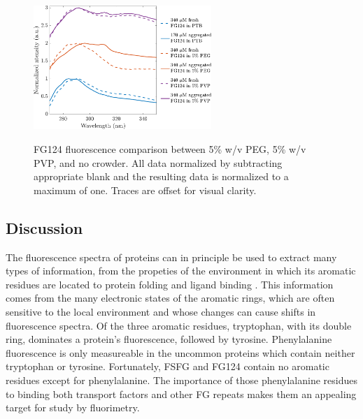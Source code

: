 \begin{figure}
\caption[FG124 fluorescence comparison between crowding agents.]{FG124 fluorescence comparison between 5\% w/v PEG, 5\% w/v PVP, and no crowder.  All data normalized by subtracting appropriate blank and the resulting data is normalized to a maximum of one.  Traces are offset for visual clarity.\\}
\centering
\includegraphics[width=0.6\textwidth]{figs/ch05/stacked-FG124-fluorimetry.pdf}
\label{fig:stacked-FG124-fluorimetry}
\end{figure}

\subsection{Discussion}

The fluorescence spectra of proteins can in principle be used to extract many types of information, from the propeties of the environment in which its aromatic residues are located to protein folding and ligand binding \cite{ladokhin00}.  This information comes from the many electronic states of the aromatic rings, which are often sensitive to the local environment and whose changes can cause shifts in fluorescence spectra.  Of the three aromatic residues, tryptophan, with its double ring, dominates a protein's fluorescence, followed by tyrosine.  Phenylalanine fluorescence is only measureable in the uncommon proteins which contain neither tryptophan or tyrosine.  Fortunately, FSFG and FG124 contain no aromatic residues except for phenylalanine.  The importance of those phenylalanine residues to binding both transport factors and other FG repeats makes them an appealing target for study by fluorimetry.  

